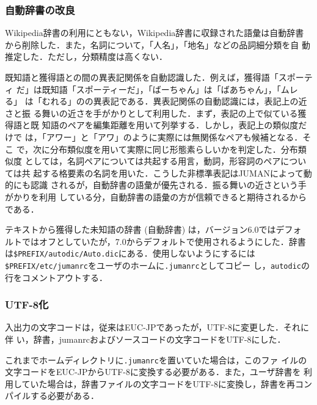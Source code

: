 \documentclass[a4j,titlepage]{jarticle}
\begin{document}
\subsubsection{自動辞書の改良}

Wikipedia辞書の利用にともない，Wikipedia辞書に収録された語彙は自動辞書
から削除した．また，名詞について，「人名」，「地名」などの品詞細分類を自
動推定した．ただし，分類精度は高くない．

既知語と獲得語との間の異表記関係を自動認識した．例えば，獲得語「スポーティ
だ」は既知語「スポーティーだ」，「ばーちゃん」は「ばあちゃん」，「ムレる」
は「むれる」のの異表記である．異表記関係の自動認識には，表記上の近さと振
る舞いの近さを手がかりとして利用した．まず，表記の上で似ている獲得語と既
知語のペアを編集距離を用いて列挙する．しかし，表記上の類似度だけで
は，「アワー」と「アワ」のように実際には無関係なペアも候補となる．そこ
で，次に分布類似度を用いて実際に同じ形態素らしいかを判定した．分布類似度
としては，名詞ペアについては共起する用言，動詞，形容詞のペアについては共
起する格要素の名詞を用いた．こうした非標準表記はJUMANによって動的にも認識
されるが，自動辞書の語彙が優先される．振る舞いの近さという手がかりを利用
している分，自動辞書の語彙の方が信頼できると期待されるからである．

テキストから獲得した未知語の辞書 (自動辞書) は，バージョン6.0ではデフォ
ルトではオフとしていたが，7.0からデフォルトで使用されるようにした．辞書
は\texttt{\$PREFIX/autodic/Auto.dic}にある．使用しないようにするには
\texttt{\$PREFIX/etc/jumanrc}をユーザのホームに{\tt .jumanrc}としてコピー
し，\texttt{autodic}の行をコメントアウトする．


\subsubsection{UTF-8化}

入出力の文字コードは，従来はEUC-JPであったが，UTF-8に変更した．それに伴
い，辞書，jumanrcおよびソースコードの文字コードをUTF-8にした．

これまでホームディレクトリに\texttt{.jumanrc}を置いていた場合は，このファ
イルの文字コードをEUC-JPからUTF-8に変換する必要がある．また，ユーザ辞書を
利用していた場合は，辞書ファイルの文字コードをUTF-8に変換し，辞書を再コン
パイルする必要がある．


\end{document}

